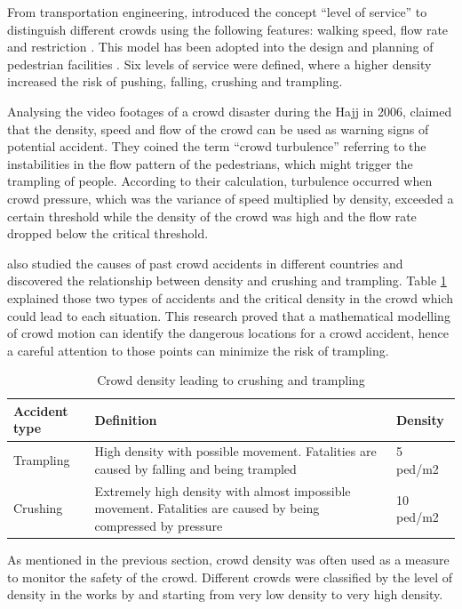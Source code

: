 From transportation engineering, \citet{Fruin1970} introduced the concept ``level of service'' to distinguish different crowds using the following features: walking speed, flow rate and restriction \citep{Challenger2009}. This model has been adopted into the design and planning of pedestrian facilities \citep{Shiwakoti2008,Ye2008}. Six levels of service were defined, where a higher density increased the risk of pushing, falling, crushing and trampling.

Analysing the video footages of a crowd disaster during the Hajj in 2006, \citet{Helbing2007} claimed that the density, speed and flow of the crowd can be used as warning signs of potential accident. They coined the term ``crowd turbulence'' referring to the instabilities in the flow pattern of the pedestrians, which might trigger the trampling of people. According to their calculation, turbulence occurred when crowd pressure, which was the variance of speed multiplied by density, exceeded a certain threshold while the density of the crowd was high and the flow rate dropped below the critical threshold.

\citet{Lee2005} also studied the causes of past crowd accidents in different countries and discovered the relationship between density and crushing and trampling. Table \ref{table:densityCrushingTrampling} explained those two types of accidents and the critical density in the crowd which could lead to each situation. This research proved that a mathematical modelling of crowd motion can identify the dangerous locations for a crowd accident, hence a careful attention to those points can minimize the risk of trampling.

\begin{table}
	\caption{Crowd density leading to crushing and trampling}
	\label{table:densityCrushingTrampling}
	\centering
	\begin{tabular}{|l|p{9.5cm}|l|}
		\hline
		\textbf{Accident type} & \textbf{Definition} & \textbf{Density} \\ \hline \hline
		Trampling & High density with possible movement. Fatalities are caused by falling and being trampled & 5 ped/m2 \\ \hline
		Crushing & Extremely high density with almost impossible movement. Fatalities are caused by being compressed by pressure & 10 ped/m2 \\ \hline
	\end{tabular}
\end{table}

As mentioned in the previous section, crowd density was often used as a measure to monitor the safety of the crowd. Different crowds were classified by the level of density in the works by \citet{Marana1997} and \citet{Weppner2013} starting from very low density to very high density.

